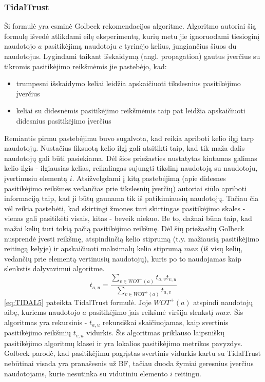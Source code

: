 \documentclass{VUMIFInfMagistrinis}
\begin{document}
\subsubsection{TidalTrust}
 Ši formulė yra esminė Golbeck rekomendacijos algoritme. Algoritmo autoriai šią formulę išvedė atlikdami eilę eksperimentų, kurių metu jie ignoruodami tiesioginį naudotojo $a$ pasitikėjimą naudotoju $c$ tyrinėjo kelius, jungiančius šiuos du naudotojus. Lygindami taikant išskaidymą (angl. propagation) gautus įverčius su tikromis pasitikėjimo reikšmėmis jie pastebėjo, kad: 
\begin{itemize}
	\item trumpesni išskaidymo keliai leidžia apskaičiuoti tikslesnius pasitikėjimo įverčius
	\item keliai su didesnėmis pasitikėjimo reikšmėmis taip pat leidžia apskaičiuoti didesnius pasitikėjimo įverčius
\end{itemize}
Remiantis pirmu pastebėjimu buvo sugalvota, kad reikia apriboti kelio ilgį tarp naudotojų. Nustačius fiksuotą kelio ilgį gali atsitikti taip, kad tik maža dalis naudotojų gali būti pasiekiama. Dėl šios priežasties nustatytas kintamas galimas kelio ilgis - ilgiausias kelias, reikalingas sujungti tikslinį naudotoją su naudotoju, įvertinusiu elementą $i$.
\newline
\indent
Atsižvelgdami į kitą pastebėjimą (apie didesnes pasitikėjimo reikšmes vedančias prie tikslesnių įverčių) autoriai siūlo apriboti informaciją taip, kad ji būtų gaunama tik iš patikimiausių naudotojų. Tačiau čia vėl reikia pastebėti, kad skirtingi žmones turi skirtingas pasitikėjimo skales - vienas gali pasitikėti visais, kitas - beveik niekuo. Be to, dažnai būna taip, kad mažai kelių turi tokią pačią pasitikėjimo reikšmę. Dėl šių priežasčių Golbeck nusprendė įvesti reikšmę, atspindinčią kelio stiprumą (t.y. mažiausią pasitikėjimo reitingą kelyje) ir apskaičiuoti maksimalų kelio stiprumą $max$ (iš visų kelių, vedančių prie elementą vertinusių naudotojų), kuris po to naudojamas kaip slenkstis dalyvavimui algoritme.
\begin{equation}\label{eq:TIDAL5}
t_{a,u} = \frac{\sum\limits_{v \in WOT^{+}(a)}t_{a,v}t_{v,u}}{\sum\limits_{v \in WOT^{+}(a)}t_{a,v}}
\end{equation}
\eqref{eq:TIDAL5} pateikta TidalTrust formulė. Joje $WOT^{+}(a)$ atspindi naudotojų aibę, kuriems naudotojo $a$ pasitikėjimo jais reikšmė viršija slenkstį $max$.
\newline
\indent
Šis algoritmas yra rekursinis - $t_{a,u}$ rekursiškai skaičiuojamas, kaip svertinis pasitikėjimo reikšmių $t_{v,u}$ vidurkis. Šis algoritmas priklauso laipsniškų pasitikėjimo algoritmų klasei ir yra lokalios pasitikėjimo metrikos pavyzdys.
\newline
\indent
Golbeck parodė, kad pasitikėjimu pagrįstas svertinis vidurkis kartu su TidalTrust nebūtinai visada yra pranašesnis už BF, tačiau duoda žymiai geresnius įverčius naudotojams, kurie nesutinka su vidutiniu elemento $i$ reitingu.
\end{document}
